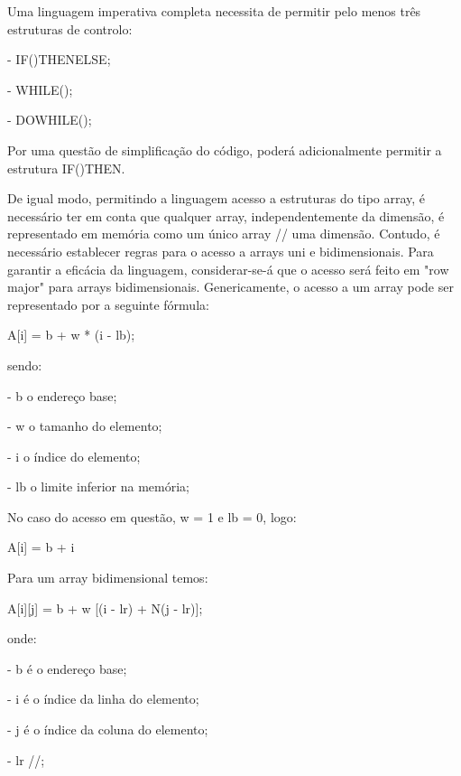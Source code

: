 Uma linguagem imperativa completa necessita de permitir pelo menos três estruturas de controlo:

- IF()THEN{}ELSE{};

- WHILE(){};

- DO{}WHILE();

Por uma questão de simplificação do código, poderá adicionalmente permitir a estrutura IF()THEN{}.

De igual modo, permitindo a linguagem acesso a estruturas do tipo array, é necessário ter em conta que qualquer array, independentemente da dimensão, é representado em memória como um único array // uma dimensão. Contudo, é necessário establecer regras para o acesso a arrays uni e bidimensionais. Para garantir a eficácia da linguagem, considerar-se-á que o acesso será feito em "row major" para arrays bidimensionais.
Genericamente, o acesso a um array pode ser representado por a seguinte fórmula:

A[i] = b + w * (i - lb);

sendo:

- b o endereço base;

- w o tamanho do elemento;

- i o índice do elemento;

- lb o limite inferior na memória;

No caso do acesso em questão, w = 1 e lb = 0, logo:

A[i] = b + i


Para um array bidimensional temos:

A[i][j] = b + w [(i - lr) + N(j - lr)];

onde:

- b é o endereço base;

- i é o índice da linha do elemento;

- j é o índice da coluna do elemento;

- lr //;


